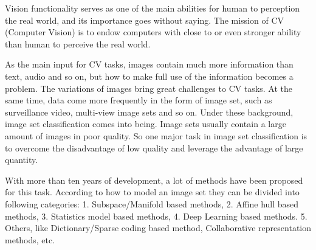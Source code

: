 \begin{eabstract} 
Vision functionality serves as one of the main abilities for human to perception the real world, and its importance goes without saying. The mission of CV (Computer Vision) is to endow computers with close to or even stronger ability than human to perceive the real world. 

As the main input for CV tasks, images contain much more information than text, audio and so on, but how to make full use of the information becomes a problem. The variations of images bring great challenges to CV tasks. At the same time, data come more frequently in the form of image set, such as surveillance video, multi-view image sets and so on. Under these background, image set classification comes into being. Image sets usually contain a large amount of images in poor quality. So one major task in image set classification is to overcome the disadvantage of low quality and leverage the advantage of large quantity. 

With more than ten years of development, a lot of methods have been proposed for this task. According to how to model an image set they can be divided into following categories: 1. Subspace/Manifold based methods, 2. Affine hull based methods, 3. Statistics model based methods, 4. Deep Learning based methods. 5. Others, like Dictionary/Sparse coding based method, Collaborative representation methods, etc.


\end{eabstract}
